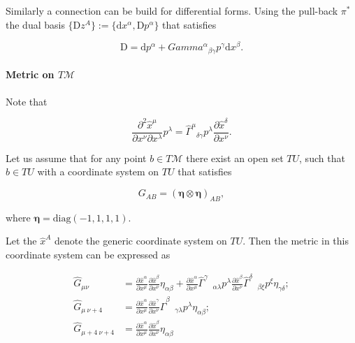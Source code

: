 Similarly a connection can be build for differential forms. 
Using the pull-back $\pi^*$ the dual basis $\{ \text{D}z^{A} \}:=\{\text{d}x^{\alpha}, \text{D}p^{\alpha}\}$ that satisfies 

\begin{equation}
\text{D} = \text{d} p ^{\alpha} + {Gamma^{\alpha}}_{\beta\gamma}p^{\gamma}\text{d}x^{\beta}.
\end{equation}


\paragraph{Metric on $T\mathcal{M}$}


Note that 

\begin{equation}
\frac{\partial^2 \hat{x}^{\mu}}{\partial x^{\nu}\partial x^{\lambda}}p^{\lambda} = {\hat{\Gamma}^{\mu}}_{\delta\gamma}p^{\lambda}\frac{\partial\hat{x}^{\delta}}{\partial x^{\nu}}.
\end{equation}

Let us assume that for any point $b\in T\mathcal{M}$ there exist an open set $TU$, such that $b\in TU$ with a coordinate system on $TU$ that satisfies

\begin{equation}
G_{AB} = (\boldsymbol{\eta}\otimes\boldsymbol{\eta})_{AB},
\end{equation}

where $\boldsymbol{\eta} = \text{diag}(-1, 1, 1, 1)$. 

Let the $\hat{x}^A$ denote the generic coordinate system on $TU$. 
Then the metric in this coordinate system can be expressed as

\begin{align}
\hat{G}_{\mu\nu} &= \frac{\partial \hat{x}^{\alpha}}{\partial x^{\mu}}\frac{\partial \hat{x}^{\beta}}{\partial x^{\nu}}\eta_{\alpha\beta} + \frac{\partial \hat{x}^{\alpha}}{\partial x^{\mu}}{\hat{\Gamma}^{\gamma}}_{\:\:\:\alpha\lambda}p^{\lambda}\frac{\partial \hat{x}^{\beta}}{\partial x^{\nu}}{\hat{\Gamma}^{\delta}}_{\:\:\:\beta\xi}p^{\xi}\eta_{\gamma\delta}; \\
\hat{G}_{\mu\: \nu+4} &= \frac{\partial \hat{x}^{\alpha}}{\partial x^{\mu}}\frac{\partial \hat{x}^{\gamma}}{\partial x^{\nu}}{\hat{\Gamma}^{\beta}}_{\:\:\:\gamma\lambda}p^{\lambda}\eta_{\alpha\beta}; \\
\hat{G}_{\mu+4 \: \nu+4} &= \frac{\partial \hat{x}^{\alpha}}{\partial x^{\mu}}\frac{\partial \hat{x}^{\beta}}{\partial x^{\nu}} \eta_{\alpha\beta}
\end{align}

